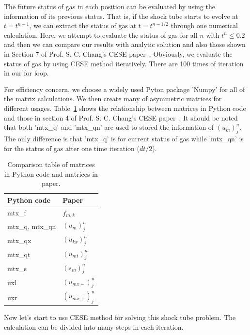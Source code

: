 \documentclass[a4paper,12pt,dvips]{article}
\begin{document}
The future status of gas in each position can be evaluated by using the 
information of its previous status. That is, if the shock tube starts to evolve 
at $t=t^{n-1}$, we can extract the status of gas at $t=t^{n-1/2}$ through one 
numerical calculation.
Here, we attempt to evaluate the status of gas for all $n$ with $t^{n}\leq0.2$
and then we can compare our results with analytic solution and also those shown
in Section 7 of Prof. S. C. Chang's CESE paper~\cite{CESE_Shin_Chung_Chang_1995}.
Obviously, we evaluate the status of gas by using CESE method iteratively.
There are 100 times of iteration in our for loop.

For efficiency concern, we choose a widely used Pyton package 'Numpy' for all of 
the matrix calculations. We then create many of asymmetric matrices for different 
usages. Table~\ref{tab:mtx_comparision} shows the relationship between matrices 
in Python code and those in section 4 of Prof. S. C. Chang's CESE 
paper~\cite{CESE_Shin_Chung_Chang_1995}.
It should be noted that both 'mtx\_q' and 'mtx\_qn' are used to stored the
information of $(u_{m})^{n}_{j}$. The only difference is that 'mtx\_q' is for
current status of gas while 'mtx\_qn' is for the status of gas after one time
iteration ($dt/2$).

\begin{table}[ht]
\begin{center}
\caption{Comparison table of matrices in Python code and matrices in paper.
        \label{tab:mtx_comparision}}
\begin{tabular}{l|l}
\hline\hline
Python code         & Paper \\\hline
mtx\_f              & $f_{m,k}$ \\
mtx\_q, mtx\_qn     & $(u_{m})^{n}_{j}$ \\
mtx\_qx             & $(u_{kx})^{n}_{j}$ \\
mtx\_qt             & $(u_{mt})^{n}_{j}$ \\
mtx\_s              & $(s_{m})^{n}_{j}$ \\
uxl                 & $(u_{mx-})^{n}_{j}$ \\
uxr                 & $(u_{mx+})^{n}_{j}$ \\
\hline\hline
\end{tabular}
\end{center}
\end{table}

Now let's start to use CESE method for solving this shock tube problem.
The calculation can be divided into many steps in each iteration.
\end{document}
